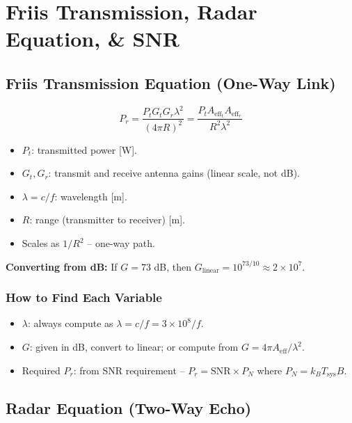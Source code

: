 \documentclass[10pt,letterpaper]{article}
\newcommand{\Aeff}{A_{\mathrm{eff}}}
\begin{document}
\section{Friis Transmission, Radar Equation, \& SNR}

\subsection{Friis Transmission Equation (One-Way Link)}

\begin{tcolorbox}[formulabox, title={Friis Equation}]
\begin{equation}
  P_r = \frac{P_t G_t G_r\lambda^2}{(4\pi R)^2} = \frac{P_t\Aeff_t\Aeff_r}{R^2\lambda^2}
\end{equation}
\begin{itemize}[noitemsep]
  \item $P_t$: transmitted power [W].
  \item $G_t, G_r$: transmit and receive antenna gains (linear scale, not dB).
  \item $\lambda = c/f$: wavelength [m].
  \item $R$: range (transmitter to receiver) [m].
  \item Scales as $1/R^2$ -- one-way path.
\end{itemize}
\textbf{Converting from dB:} If $G = 73$ dB, then $G_\mathrm{linear} = 10^{73/10} \approx 2\times10^7$.
\end{tcolorbox}

\subsubsection{How to Find Each Variable}
\begin{itemize}[noitemsep]
  \item $\lambda$: always compute as $\lambda = c/f = 3\times10^8/f$.
  \item $G$: given in dB, convert to linear; or compute from $G = 4\pi\Aeff/\lambda^2$.
  \item Required $P_r$: from SNR requirement -- $P_r = \mathrm{SNR}\times P_N$ where $P_N = k_B T_\mathrm{sys}B$.
\end{itemize}

\subsection{Radar Equation (Two-Way Echo)}
\end{document}
